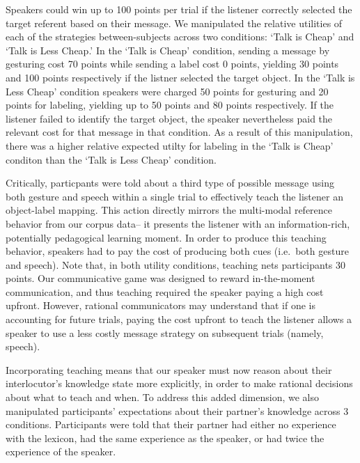 \documentclass[10pt, letterpaper]{article}
\begin{document}
Speakers could win up to 100 points per trial if the listener correctly
selected the target referent based on their message. We manipulated the
relative utilities of each of the strategies between-subjects across two
conditions: `Talk is Cheap' and `Talk is Less Cheap.' In the `Talk is
Cheap' condition, sending a message by gesturing cost 70 points while
sending a label cost 0 points, yielding 30 points and 100 points
respectively if the listner selected the target object. In the `Talk is
Less Cheap' condition speakers were charged 50 points for gesturing and
20 points for labeling, yielding up to 50 points and 80 points
respectively. If the listener failed to identify the target object, the
speaker nevertheless paid the relevant cost for that message in that
condition. As a result of this manipulation, there was a higher relative
expected utilty for labeling in the `Talk is Cheap' conditon than the
`Talk is Less Cheap' condition.

Critically, particpants were told about a third type of possible message
using both gesture and speech within a single trial to effectively teach
the listener an object-label mapping. This action directly mirrors the
multi-modal reference behavior from our corpus data-- it presents the
listener with an information-rich, potentially pedagogical learning
moment. In order to produce this teaching behavior, speakers had to pay
the cost of producing both cues (i.e.~both gesture and speech). Note
that, in both utility conditions, teaching nets participants 30 points.
Our communicative game was designed to reward in-the-moment
communication, and thus teaching required the speaker paying a high cost
upfront. However, rational communicators may understand that if one is
accounting for future trials, paying the cost upfront to teach the
listener allows a speaker to use a less costly message strategy on
subsequent trials (namely, speech).

Incorporating teaching means that our speaker must now reason about
their interlocutor's knowledge state more explicitly, in order to make
rational decisions about what to teach and when. To address this added
dimension, we also manipulated participants' expectations about their
partner's knowledge across 3 conditions. Participants were told that
their partner had either no experience with the lexicon, had the same
experience as the speaker, or had twice the experience of the speaker.
\end{document}
